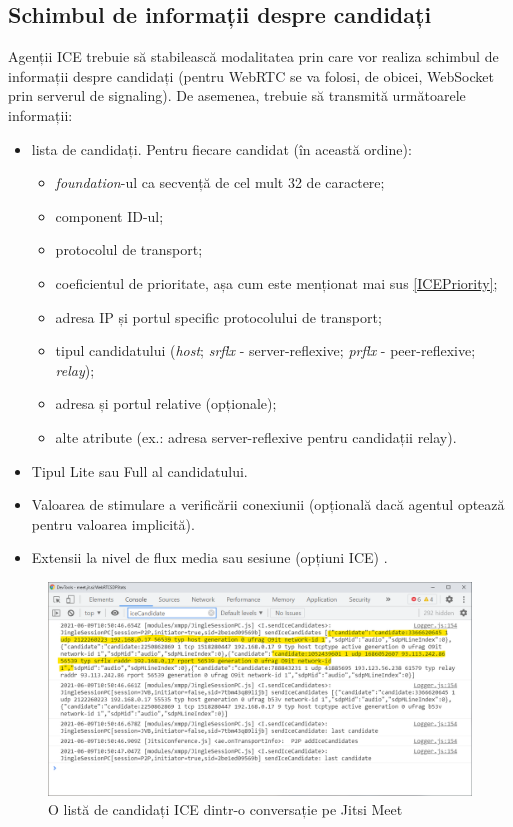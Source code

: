 \subsection{Schimbul de informații despre candidați}
\indent \par Agenții ICE trebuie să stabilească modalitatea prin care vor realiza schimbul de informații despre candidați (pentru WebRTC se va folosi, de obicei, WebSocket prin serverul de signaling). De asemenea, trebuie să transmită următoarele informații:
\begin{itemize}
    \item lista de candidați. Pentru fiecare candidat (în această ordine):
    \begin{itemize}
        \item \textit{foundation}-ul ca secvență de cel mult 32 de caractere;
        \item component ID-ul;
        \item protocolul de transport;
        \item coeficientul de prioritate, așa cum este menționat mai sus \ref{ICEPriority};
        \item adresa IP și portul specific protocolului de transport;
        \item tipul candidatului (\textit{host}; \textit{srflx} - server-reflexive; \textit{prflx} - peer-reflexive; \textit{relay});
        \item adresa și portul relative (opționale);
        \item alte atribute (ex.: adresa server-reflexive pentru candidații relay).
    \end{itemize}
    \item Tipul Lite sau Full al candidatului.
    \item Valoarea de stimulare a verificării conexiunii (opțională dacă agentul optează pentru valoarea implicită).
    \item Extensii la nivel de flux media sau sesiune (opțiuni ICE) \cite{rfc8445}.
\end{itemize}
\begin{figure}[H]
    \centering
    \includegraphics[width=16cm]{figures/ice_exchange_jitsi.png}
    \caption{O listă de candidați ICE dintr-o conversație pe Jitsi Meet}
    \label{ICEExchangeJitsi}
\end{figure}
